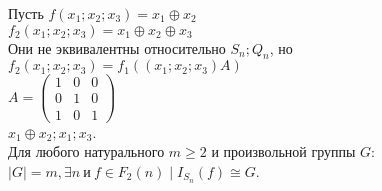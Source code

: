 \example 
Пусть $f(x_1;x_2;x_3)=x_1\oplus x_2$\\
$f_2(x_1;x_2;x_3)=x_1 \oplus x_2 \oplus x_3$ \\
Они не эквивалентны относительно $S_n;Q_n$, но
$f_2(x_1;x_2;x_3)=f_1((x_1;x_2;x_3)A)$\\



$A=
\begin{pmatrix}
  1 & 0 & 0\\
  0 & 1 & 0\\
  1 & 0 & 1
\end{pmatrix}$\\

$x_1 \oplus x_2;x_1;x_3$.\\

\thr
Для любого натурального $ m \geqslant 2$ и произвольной группы $G$:
$|G|=m, \exists n\  \text{и}\  f\in F_2(n) \mid I_{S_n}(f) \cong G$.